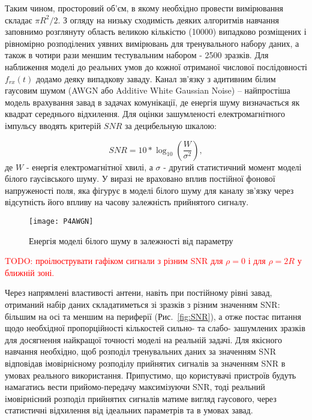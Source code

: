 Таким чином, просторовий об'єм, в якому необхідно провести вимірювання 
складає $ \pi R^2 / 2 $. З огляду на низьку сходимість деяких алгоритмів 
навчання заповнимо розглянуту область великою кількістю (10000) випадково 
розміщених і рівномірно розподілених уявних вимірювань для тренувального 
набору даних, а також в чотири рази меншим тестувальним набором - 
2500 зразків. Для наближення моделі до реальних умов до кожної
отриманої числової послідовності $ f_{rx} (t) $ додамо деяку випадкову 
заваду. Канал зв'язку з адитивним білим гаусовим шумом (AWGN або Additive 
White Gaussian Noise) -- найпростіша модель врахування завад в задачах 
комунікації, де енергія шуму визначається як квадрат середнього відхилення. 
Для оцінки зашумленості електромагнітного імпульсу вводять критерій $ SNR $ 
за децибельную шкалою:

\begin{equation} \label{eq:snr}
SNR = 10 * \log_{10} \left( \frac{W}{\sigma^2} \right),
\end{equation}
%
де $ W $ - енергія електромагнітної хвилі, а $ \sigma $ - другий статистичний 
момент моделі білого гаусівського шуму. У виразі не враховано вплив постійної 
фонової напруженості поля, яка фігурує в моделі білого шуму для каналу зв'язку 
через відсутність його впливу на часову залежність прийнятого сигналу.

\begin{figure}[htbp] \begin{center}
\texttt{[image: P4AWGN]}
\caption{Енергія моделі білого шуму в залежності від параметру} \label{fig:P4AWGN}
\end{center} \end{figure}

\textcolor{red}{TODO: проілюструвати гафіком сигнали з різним SNR для 
$ \rho = 0$ і для $ \rho = 2R $ у ближній зоні.}

Через напрямлені властивості антени, навіть при постійному рівні завад, 
отриманий набір даних складатиметься зі зразків з різним значенням SNR: 
більшим на осі та меншим на периферії (Рис.~\ref{fig:SNR}), а отже постає 
питання щодо необхідної пропорційності кількостей сильно- та слабо- 
зашумлених зразків для досягнення найкращої точності моделі на реальній 
задачі. Для якісного навчання необхідно, щоб розподіл тренувальних даних за 
значенням SNR відповідав імовірнісному розподілу прийнятих сигналів за 
значенням SNR в умовах реального використання. Припустимо, що користувачі 
пристроїв будуть намагатись вести прийомо-передачу максимізуючи SNR, тоді 
реальний імовірнісний розподіл прийнятих сигналів матиме вигляд 
гаусового, через статистичні відхилення від ідеальних параметрів та в 
умовах завад.

